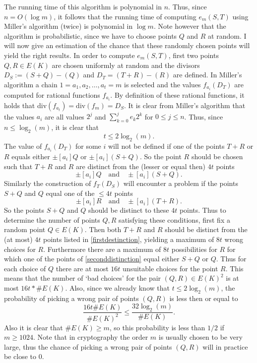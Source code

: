 \documentclass{article}
\numberwithin{equation}{section}
\theoremstyle{definition}
\begin{document}
The running time of this algorithm is polynomial in $n$. Thus, since $n=O(\log m)$, it follows that the running time of computing $e_m(S,T)$ using Miller's algorithm (twice) is polynomial in $\log m$. Note however that the algorithm is probabilistic, since we have to choose points $Q$ and $R$ at random. I will now give an estimation of the chance that these randomly chosen points will yield the right results. In order to compute $e_m(S,T)$, first two points $Q,R\in E(K)$ are chosen uniformly at random and the divisors $D_S:=(S+Q)-(Q)$ and $D_T=(T+R)-(R)$ are defined. In Miller's algorithm a chain $1=a_1,a_2,\ldots,a_t=m$ is selected and the values $f_{a_i}(D_T)$ are computed for rational functions $f_{a_i}$. By definition of these rational functions, it holds that div$(f_{a_t})=\text{div}(f_m)=D_S$. It is clear from Miller's algorithm that the values $a_i$ are all values $2^j$ and $\sum_{k=0}^j e_k 2^k$ for $0 \leq j \leq n$. Thus, since $n \leq \log_2(m)$, it is clear that $$t \leq 2 \log_2(m).$$ The value of $f_{a_i}(D_T)$ for some $i$ will not be defined if one of the points $T+R$ or $R$ equals either $\pm[a_i]Q$ or $\pm [a_i](S+Q)$. So the point $R$ should be chosen such that $T+R$ and $R$ are distinct from the (lesser or equal then) $4t$ points \begin{equation}\label{firstdestinction}\pm [a_i]Q \quad \text{and} \quad \pm [a_i](S+Q).\end{equation} Similarly the construction of $f_T(D_S)$ will encounter a problem if the points $S+Q$ and $Q$ equal one of the $\leq 4t$ points \begin{equation}\label{seconddistinction}\pm[a_i]R\quad \text{and} \quad \pm[a_i](T+R).\end{equation} So the points $S+Q$ and $Q$ should be distinct to these $4t$ points. Thus to determine the number of points $Q,R$ satisfying these conditions, first fix a random point $Q\in E(K)$. Then both $T+R$ and $R$ should be distinct from the (at most) $4t$ points listed in \ref{firstdestinction}, yielding a maximum of $8t$ wrong choices for $R$. Furthermore there are a maximum of $8t$ possibilities for $R$ for which one of the points of \ref{seconddistinction} equal either $S+Q$ or $Q$. Thus for each choice of $Q$ there are at most $16t$ unsuitable choices for the point $R$. This means that the number of `bad choices' for the pair $(Q,R) \in E(K)^2$ is at most $16t*\#E(K)$. Also, since we already know that $t \leq 2 \log_2(m)$, the probability of picking a wrong pair of points $(Q,R)$ is less then or equal to $$\frac{16t \# E(K)}{\#E(K)^2} \leq \frac{32 \log_2(m)}{\#E(K)}.$$ Also it is clear that $\#E(K) \geq m$, so this probability is less than $1/2$ if $m \geq 1024$. Note that in cryptography the order $m$ is usually chosen to be very large, thus the chance of picking a wrong pair of points $(Q,R)$ will in practice be close to $0$.  
\end{document}
